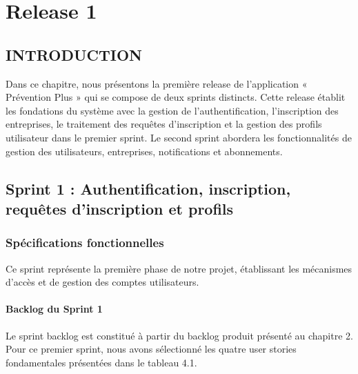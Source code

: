 \chapter{Release 1}

\begin{spacing}{1.2}
\minitoc
\thispagestyle{MyStyle}
\end{spacing}
\newpage

\section*{INTRODUCTION}
\noindent Dans ce chapitre, nous présentons la première release de l'application « Prévention Plus » qui se compose de deux sprints distincts. Cette release établit les fondations du système avec la gestion de l'authentification, l'inscription des entreprises, le traitement des requêtes d'inscription et la gestion des profils utilisateur dans le premier sprint. Le second sprint abordera les fonctionnalités de gestion des utilisateurs, entreprises, notifications et abonnements.

\section{Sprint 1 : Authentification, inscription, requêtes d'inscription et profils}

\subsection{Spécifications fonctionnelles}
\noindent Ce sprint représente la première phase de notre projet, établissant les mécanismes d'accès et de gestion des comptes utilisateurs.

\subsubsection{Backlog du Sprint 1}
\noindent Le sprint backlog est constitué à partir du backlog produit présenté au chapitre 2. Pour ce premier sprint, nous avons sélectionné les quatre user stories fondamentales présentées dans le tableau 4.1.

